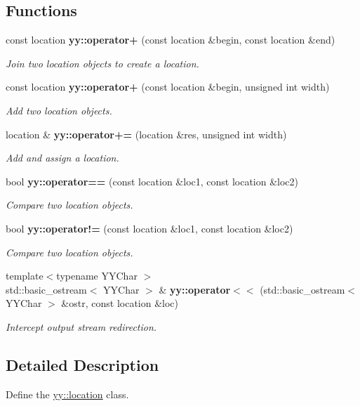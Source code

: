 \subsection*{Functions}
\begin{DoxyCompactItemize}
\item 
\hypertarget{namespaceyy_a2d68df6e5746b9aca23e7445c7a558a8}{const location {\bfseries yy\-::operator+} (const location \&begin, const location \&end)}\label{namespaceyy_a2d68df6e5746b9aca23e7445c7a558a8}

\begin{DoxyCompactList}\small\item\em Join two location objects to create a location. \end{DoxyCompactList}\item 
\hypertarget{namespaceyy_a09401c271b0db8cdd3b70df37b5ac660}{const location {\bfseries yy\-::operator+} (const location \&begin, unsigned int width)}\label{namespaceyy_a09401c271b0db8cdd3b70df37b5ac660}

\begin{DoxyCompactList}\small\item\em Add two location objects. \end{DoxyCompactList}\item 
\hypertarget{namespaceyy_a9c677252f514775b4ac6522044b1971b}{location \& {\bfseries yy\-::operator+=} (location \&res, unsigned int width)}\label{namespaceyy_a9c677252f514775b4ac6522044b1971b}

\begin{DoxyCompactList}\small\item\em Add and assign a location. \end{DoxyCompactList}\item 
\hypertarget{namespaceyy_a466b6e3dcf6a743bb058bf4989b38047}{bool {\bfseries yy\-::operator==} (const location \&loc1, const location \&loc2)}\label{namespaceyy_a466b6e3dcf6a743bb058bf4989b38047}

\begin{DoxyCompactList}\small\item\em Compare two location objects. \end{DoxyCompactList}\item 
\hypertarget{namespaceyy_aa3a5c205bc084696bb894634ae9cce80}{bool {\bfseries yy\-::operator!=} (const location \&loc1, const location \&loc2)}\label{namespaceyy_aa3a5c205bc084696bb894634ae9cce80}

\begin{DoxyCompactList}\small\item\em Compare two location objects. \end{DoxyCompactList}\item 
{\footnotesize template$<$typename Y\-Y\-Char $>$ }\\std\-::basic\-\_\-ostream$<$ Y\-Y\-Char $>$ \& {\bfseries yy\-::operator$<$$<$} (std\-::basic\-\_\-ostream$<$ Y\-Y\-Char $>$ \&ostr, const location \&loc)
\begin{DoxyCompactList}\small\item\em Intercept output stream redirection. \end{DoxyCompactList}\end{DoxyCompactItemize}


\subsection{Detailed Description}
Define the \hyperlink{classyy_1_1location}{yy\-::location} class. 